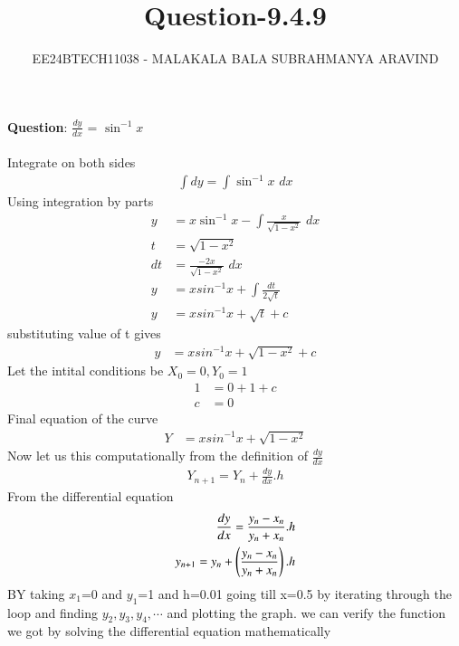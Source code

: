 \documentclass[journal]{IEEEtran}
\numberwithin{equation}{enumi}
\numberwithin{figure}{enumi}
\begin{document}

\title{Question-9.4.9}
\author{EE24BTECH11038 - MALAKALA BALA SUBRAHMANYA ARAVIND}
{\let\newpage\relax\maketitle}
\textbf{Question}:
$\frac{dy}{dx}$ = $\sin^{-1}{x}$\\


\solution \\
Integrate on both sides
\begin{align}
    \int dy=\int \sin^{-1}{x}\,\,dx
\end{align}
Using integration by parts
\begin{align}
    y&=x\sin^{-1}{x}-\int \frac{x}{\sqrt{1-x^{2}}}\,\,dx\\   
    t&=\sqrt{1-x^2}\\
    dt&=\frac{-2x}{\sqrt{1-x^2}}\,\,dx\\
    y&=xsin^{-1}x+\int \frac{dt}{2\sqrt{t}}\\
    y&=xsin^{-1}{x}+\sqrt{t}+c
\end{align}
substituting value of t gives
\begin{align}
    y&=xsin^{-1}{x}+\sqrt{1-x^2}+c
\end{align}
Let the intital conditions be $X_{0}=0,Y_{0}=1$
\begin{align}
    1&=0+1+c\\
    c&=0
\end{align}
Final equation of the curve
\begin{align}
    Y&=xsin^{-1}{x}+\sqrt{1-x^2}
\end{align}
Now let us  this computationally from the definition of $\frac{dy}{dx}$ 
\begin{align}
    Y_{n+1}=Y_n+\frac{dy}{dx}.h
\end{align}
From the differential equation
\begin{align}
    \frac{dy}{dx}=\frac{y_n-x_n}{y_n+x_n}.h\\
    y_{n+1}=y_n+\left(\frac{y_n-x_n}{y_n+x_n}\right).h
\end{align}
BY taking $x_1$=0 and $y_1$=1 and h=0.01 going till x=0.5 by iterating through the loop and finding $y_2,y_3,y_4,\cdots$ and plotting the graph. we can verify the function we got by solving the differential equation mathematically
\end{document}
